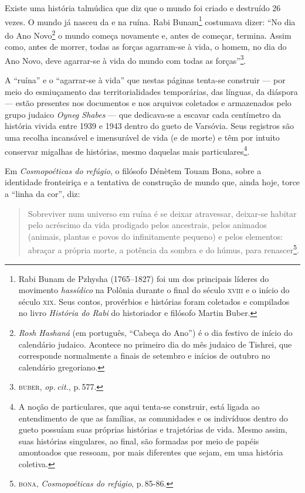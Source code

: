 \noindent{}Existe uma história talmúdica que diz que o mundo foi criado e
destruído 26 vezes. O mundo já nasceu da e na ruína. Rabi
Bunam\footnote{Rabi Bunam de Pzhysha (1765--1827) foi um dos principais
  líderes do movimento \emph{hassídico} na Polônia durante o final do
  século \textsc{xviii} e o início do século \textsc{xix}. Seus contos, provérbios e
  histórias foram coletados e compilados no livro \emph{História do
  Rabi} do historiador e filósofo Martin Buber.} costumava dizer:
``No dia do Ano Novo\footnote{\emph{Rosh Hashaná} (em português,
  ``Cabeça do Ano'') é o dia festivo de início do calendário judaico.
  Acontece no primeiro dia do mês judaico de Tishrei, que corresponde
  normalmente a finais de setembro e inícios de outubro no calendário
  gregoriano.} o mundo começa novamente e, antes de começar,
termina. Assim como, antes de morrer, todas as forças agarram-se à vida,
o homem, no dia do Ano Novo, deve agarrar-se à vida do mundo com todas
as forças''\footnote{\textsc{buber}, \emph{op.\,cit.}, p.\,577.}.

A ``ruína'' e o ``agarrar-se à vida'' que nestas páginas
tenta-se construir --- por meio do esmiuçamento das territorialidades
temporárias, das línguas, da diáspora --- estão presentes nos documentos
e nos arquivos coletados e armazenados pelo grupo judaico \emph{Oyneg
Shabes} --- que dedicava-se a escavar
cada centímetro da história vivida entre 1939 e 1943 dentro do gueto de
Varsóvia. Seus registros são uma recolha incansável e imensurável de
vida (e de morte) e têm por intuito conservar migalhas de histórias,
mesmo daquelas mais particulares\footnote{A noção de particulares, que
  aqui tenta-se construir, está ligada ao entendimento de que as
  famílias, as comunidades e os indivíduos dentro do gueto possuíam suas
  próprias histórias e trajetórias de vida. Mesmo assim, suas histórias
  singulares, ao final, são formadas por meio de papéis amontoados que
  ressoam, por mais diferentes que sejam, em uma história coletiva.}.

Em \emph{Cosmopoéticas do refúgio}, o filósofo Dénètem Touam Bona, sobre
a identidade fronteiriça e a tentativa de construção de mundo que, ainda
hoje, torce a ``linha da cor'', diz:

\begin{quote}
Sobreviver num universo em ruína é se deixar atravessar, deixar-se
habitar pelo acréscimo da vida prodigado pelos ancestrais, pelos
animados (animais, plantas e povos do infinitamente pequeno) e pelos
elementos: abraçar a própria morte, a potência da sombra e do húmus,
para renascer\footnote{\textsc{bona}, \emph{Cosmopoéticas do refúgio}, p.\,85-86.}.
\end{quote}


